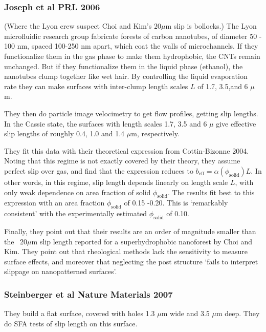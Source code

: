 \documentclass{article}
\begin{document}
\subsubsection*{Joseph et al PRL 2006}

(Where the Lyon crew suspect Choi and Kim's $20\mu$m slip is bollocks.)
The Lyon microfluidic research group fabricate forests of carbon nanotubes, of diameter 50 - 100 nm, spaced 100-250 nm apart, which coat the walls of microchannels. If they functionalize them in the gas phase to make them hydrophobic, the CNTs remain unchanged.  But if they functionalize them in the liquid phase (ethanol), the nanotubes clump together like wet hair.  By controlling the liquid evaporation rate they can make surfaces with inter-clump length scales $L$ of 1.7, 3.5,and 6 $\mu$m.

They then do particle image velocimetry to get flow profiles, getting slip lengths.
In the Cassie state, the surfaces with length scales 1.7, 3.5 and 6 $\mu$ give effective slip lengths of roughly 0.4, 1.0 and 1.4 $\mu$m, respectively.

They fit this data with their theoretical expression from Cottin-Bizonne 2004.  Noting that this regime is not exactly covered by their theory, they assume perfect slip over gas, and find that the expression reduces to $b_{\mathrm{eff}} = \alpha(\phi_{\mathrm{solid}}) L$.  In other words, in this regime, slip length depends linearly on length scale $L$, with only weak dependence on area fraction of solid $\phi_{\mathrm{solid}}$.  The results fit best to this expression with an area fraction $\phi_{\mathrm{solid}}$ of 0.15 -0.20.  This is `remarkably consistent' with the experimentally estimated $\phi_{\mathrm{solid}}$ of 0.10.

Finally, they point out that their results are an order of magnitude smaller than the ~20$\mu$m slip length reported for a superhydrophobic nanoforest by Choi and Kim.  They point out that rheological methods lack the sensitivity to measure surface effects, and moreover that neglecting the post structure `fails to interpret slippage on nanopatterned surfaces'.


\subsubsection*{Steinberger et al Nature Materials 2007}

They build a flat surface, covered with holes 1.3 $\mu$m wide and 3.5 $\mu$m deep.  They do SFA tests of slip length on this surface.
\end{document}
